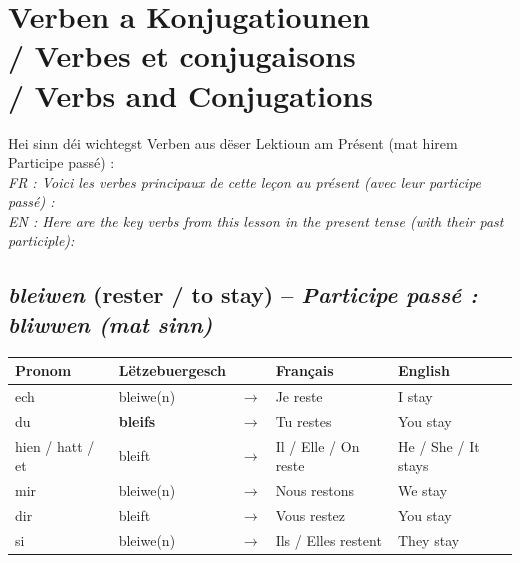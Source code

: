 \vspace{1.5em}

\section[Verben a Konjugatiounen]{Verben a Konjugatiounen \\/ Verbes et conjugaisons \\/ Verbs and Conjugations}

Hei sinn déi wichtegst Verben aus dëser Lektioun am Présent (mat hirem Participe passé) : \\
\textit{FR : Voici les verbes principaux de cette leçon au présent (avec leur participe passé) :} \\
\textit{EN : Here are the key verbs from this lesson in the present tense (with their past participle):}

\subsection{\textit{bleiwen} (rester / to stay) -- \textit{Participe passé : bliwwen (mat sinn)}}
\begin{center}
    \begin{tabular}{ll c l l}
        \toprule
        \textbf{Pronom} & \textbf{Lëtzebuergesch} & & \textbf{Français} & \textbf{English} \\
        \midrule
        ech & bleiwe(n) & $\rightarrow$ & Je reste & I stay \\
        du & \textbf{bleifs} & $\rightarrow$ & Tu restes & You stay \\
        hien / hatt / et & bleift & $\rightarrow$ & Il / Elle / On reste & He / She / It stays \\
        \midrule
        mir & bleiwe(n) & $\rightarrow$ & Nous restons & We stay \\
        dir & bleift & $\rightarrow$ & Vous restez & You stay \\
        si & bleiwe(n) & $\rightarrow$ & Ils / Elles restent & They stay \\
        \bottomrule
    \end{tabular}
\end{center}

